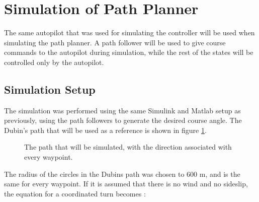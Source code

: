 \section{Simulation of Path Planner}

The same autopilot that was used for simulating the controller will be used when simulating the path planner. A path follower will be used to give course commands to the autopilot during simulation, while the rest of the states will be controlled only by the autopilot.


\subsection{Simulation Setup}

The simulation was performed using the same Simulink and Matlab setup as previously, using the path followers to generate the desired course angle. The Dubin's path that will be used as a reference is shown in figure \ref{fig:dubins_reference}.

\begin{figure}[]
    \centering
    \caption{The path that will be simulated, with the direction associated with every waypoint.}
	\label{fig:dubins_reference}
\end{figure}

The radius of the circles in the Dubins path was chosen to $600$ m, and is the same for every waypoint. If it is assumed that there is no wind and no sideslip, the equation for a coordinated turn becomes \cite{suaBEARD}:

